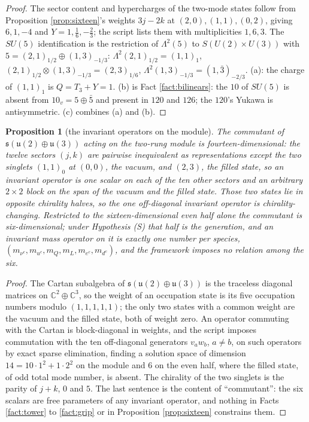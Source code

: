 \documentclass[11pt]{article}
\newtheorem{proposition}[theorem]{Proposition}
\theoremstyle{definition}
\newcommand{\C}{\mathbb{C}}
\newcommand{\uu}{\mathfrak{u}}
\begin{document}
\begin{proof}
The sector content and hypercharges of the two-mode states follow from Proposition \ref{prop:sixteen}'s weights $3j - 2k$ at $(2,0), (1,1), (0,2)$, giving $6, 1, -4$ and $Y = 1, \tfrac16, -\tfrac23$; the script lists them with multiplicities $1, 6, 3$. The $SU(5)$ identification is the restriction of $\Lambda^{2}(5)$ to $S(U(2) \times U(3))$ with $5 = (2,1)_{1/2} \oplus (1,3)_{-1/3}$: $\Lambda^{2}(2,1)_{1/2} = (1,1)_{1}$, $(2,1)_{1/2} \otimes (1,3)_{-1/3} = (2,3)_{1/6}$, $\Lambda^{2}(1,3)_{-1/3} = (1,\bar{3})_{-2/3}$. (a): the charge of $(1,1)_{1}$ is $Q = T_{3} + Y = 1$. (b) is Fact \ref{fact:bilinears}: the $10$ of $SU(5)$ is absent from $10_{v} = 5 \oplus \bar{5}$ and present in $120$ and $126$; the $120$'s Yukawa is antisymmetric. (c) combines (a) and (b).
\end{proof}

\begin{proposition}[the invariant operators on the module]\label{prop:commutant}
The commutant of $\mathfrak{s}(\uu(2) \oplus \uu(3))$ acting on the two-rung module is fourteen-dimensional: the twelve sectors $(j,k)$ are pairwise inequivalent as representations except the two singlets $(1,1)_{0}$ at $(0,0)$, the vacuum, and $(2,3)$, the filled state, so an invariant operator is one scalar on each of the ten other sectors and an arbitrary $2 \times 2$ block on the span of the vacuum and the filled state. Those two states lie in opposite chirality halves, so the one off-diagonal invariant operator is chirality-changing. Restricted to the sixteen-dimensional even half alone the commutant is six-dimensional; under Hypothesis (S) that half is the generation, and an invariant mass operator on it is exactly one number per species, $(m_{\nu^{c}}, m_{u^{c}}, m_{Q}, m_{L}, m_{e^{c}}, m_{d^{c}})$, and the framework imposes no relation among the six.
\end{proposition}

\begin{proof}
The Cartan subalgebra of $\mathfrak{s}(\uu(2) \oplus \uu(3))$ is the traceless diagonal matrices on $\C^{2} \oplus \C^{3}$, so the weight of an occupation state is its five occupation numbers modulo $(1,1,1,1,1)$; the only two states with a common weight are the vacuum and the filled state, both of weight zero. An operator commuting with the Cartan is block-diagonal in weights, and the script imposes commutation with the ten off-diagonal generators $v_{a}w_{b}$, $a \ne b$, on such operators by exact sparse elimination, finding a solution space of dimension $14 = 10 \cdot 1^{2} + 1 \cdot 2^{2}$ on the module and $6$ on the even half, where the filled state, of odd total mode number, is absent. The chirality of the two singlets is the parity of $j + k$, $0$ and $5$. The last sentence is the content of ``commutant'': the six scalars are free parameters of any invariant operator, and nothing in Facts \ref{fact:tower} to \ref{fact:grip} or in Proposition \ref{prop:sixteen} constrains them.
\end{proof}
\end{document}
